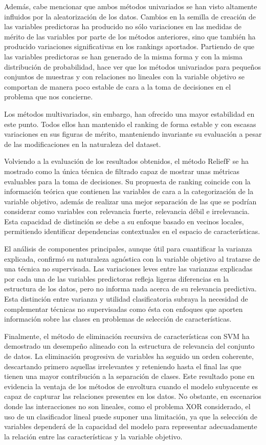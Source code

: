 \documentclass[a4paper,12pt]{article}
\begin{document}
Además, cabe mencionar que ambos métodos univariados se han visto altamente influidos por la aleatorización de los datos. Cambios en la semilla de creación de las variables predictoras ha producido no sólo variaciones en las medidas de mérito de las variables por parte de los métodos anteriores, sino que también ha producido variaciones significativas en los rankings aportados. Partiendo de que las variables predictoras se han generado de la misma forma y con la misma distribución de probabilidad, hace ver que los métodos univariados para pequeños conjuntos de muestras y con relaciones no lineales con la variable objetivo se comportan de manera poco estable de cara a la toma de decisiones en el problema que nos concierne.

Los métodos multivariados, sin embargo, han ofrecido una mayor estabilidad en este punto. Todos ellos han mantenido el ranking de forma estable y con escasas variaciones en sus figuras de mérito, manteniendo invariante su evaluación a pesar de las modificaciones en la naturaleza del dataset.

Volviendo a la evaluación de los resultados obtenidos, el método ReliefF se ha mostrado como la única técnica de filtrado capaz de mostrar unas métricas evaluables para la toma de decisiones. Su propuesta de ranking coincide con la información teórica que contienen las variables de cara a la categorización de la variable objetivo, además de realizar una mejor separación de las que se podrían considerar como variables con relevancia fuerte, relevancia débil e irrelevancia. Esta capacidad de distinción se debe a su enfoque basado en vecinos locales, permitiendo identificar dependencias contextuales en el espacio de características.

El análisis de componentes principales, aunque útil para cuantificar la varianza explicada, confirmó su naturaleza agnóstica con la variable objetivo al tratarse de una técnica no supervisada. Las variaciones leves entre las varianzas explicadas por cada una de las variables predictoras refleja ligeras diferencias en la estructura de los datos, pero no informa nada acerca de su relevancia predictiva. Esta distinción entre varianza y utilidad clasificatoria subraya la necesidad de complementar técnicas no supervisadas como ésta con enfoques que aporten información sobre las clases en problemas de selección de características.

Finalmente, el método de eliminación recursiva de características con SVM ha demostrado un desempeño alineado con la estructura de relevancia del conjunto de datos. La eliminación progresiva de variables ha seguido un orden coherente, descartando primero aquellas irrelevantes y reteniendo hasta el final las que tienen una mayor contribución a la separación de clases. Este resultado pone en evidencia la ventaja de los métodos de envoltura cuando el modelo subyacente es capaz de capturar las relaciones presentes en los datos. No obstante, en escenarios donde las interacciones no son lineales, como el problema XOR considerado, el uso de un clasificador lineal puede suponer una limitación, ya que la selección de variables dependerá de la capacidad del modelo para representar adecuadamente la relación entre las características y la variable objetivo.
\end{document}
